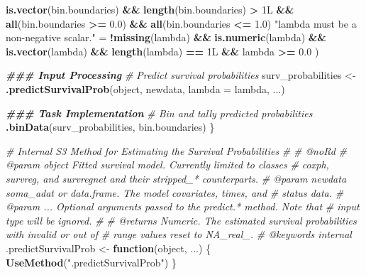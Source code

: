 \documentclass[
]{book}
\newenvironment{Shaded}{\begin{snugshade}}{\end{snugshade}}
\newcommand{\AttributeTok}[1]{\textcolor[rgb]{0.13,0.29,0.53}{#1}}
\newcommand{\CommentTok}[1]{\textcolor[rgb]{0.56,0.35,0.01}{\textit{#1}}}
\newcommand{\ControlFlowTok}[1]{\textcolor[rgb]{0.13,0.29,0.53}{\textbf{#1}}}
\newcommand{\DocumentationTok}[1]{\textcolor[rgb]{0.56,0.35,0.01}{\textbf{\textit{#1}}}}
\newcommand{\FloatTok}[1]{\textcolor[rgb]{0.00,0.00,0.81}{#1}}
\newcommand{\FunctionTok}[1]{\textcolor[rgb]{0.13,0.29,0.53}{\textbf{#1}}}
\newcommand{\NormalTok}[1]{#1}
\newcommand{\OtherTok}[1]{\textcolor[rgb]{0.56,0.35,0.01}{#1}}
\newcommand{\SpecialCharTok}[1]{\textcolor[rgb]{0.81,0.36,0.00}{\textbf{#1}}}
\newcommand{\StringTok}[1]{\textcolor[rgb]{0.31,0.60,0.02}{#1}}
\begin{document}
\begin{Shaded}
\begin{Highlighting}[]
        \FunctionTok{is.vector}\NormalTok{(bin.boundaries) }\SpecialCharTok{\&\&} \FunctionTok{length}\NormalTok{(bin.boundaries) }\SpecialCharTok{\textgreater{}}\NormalTok{ 1L }\SpecialCharTok{\&\&} 
        \FunctionTok{all}\NormalTok{(bin.boundaries }\SpecialCharTok{\textgreater{}=} \FloatTok{0.0}\NormalTok{) }\SpecialCharTok{\&\&} \FunctionTok{all}\NormalTok{(bin.boundaries }\SpecialCharTok{\textless{}=} \FloatTok{1.0}\NormalTok{)}
    \StringTok{"\textasciigrave{}lambda\textasciigrave{} must be a non{-}negative scalar."} \OtherTok{=} 
      \SpecialCharTok{!}\FunctionTok{missing}\NormalTok{(lambda) }\SpecialCharTok{\&\&} \FunctionTok{is.numeric}\NormalTok{(lambda) }\SpecialCharTok{\&\&} \FunctionTok{is.vector}\NormalTok{(lambda) }\SpecialCharTok{\&\&} 
      \FunctionTok{length}\NormalTok{(lambda) }\SpecialCharTok{==}\NormalTok{ 1L }\SpecialCharTok{\&\&}\NormalTok{ lambda }\SpecialCharTok{\textgreater{}=} \FloatTok{0.0}
\NormalTok{  )}
  
  \DocumentationTok{\#\#\# Input Processing}
  \CommentTok{\# Predict survival probabilities}
\NormalTok{  surv\_probabilities }\OtherTok{\textless{}{-}} \FunctionTok{.predictSurvivalProb}\NormalTok{(object, newdata, }\AttributeTok{lambda =}\NormalTok{ lambda, ...)}
  
  \DocumentationTok{\#\#\# Task Implementation}
  \CommentTok{\# Bin and tally predicted probabilities}
  \FunctionTok{.binData}\NormalTok{(surv\_probabilities, bin.boundaries)}
\NormalTok{\}}

\CommentTok{\#\textquotesingle{} Internal S3 Method for Estimating the Survival Probabilities}
\CommentTok{\#\textquotesingle{} }
\CommentTok{\#\textquotesingle{} @noRd}
\CommentTok{\#\textquotesingle{} @param object Fitted survival model. Currently limited to classes}
\CommentTok{\#\textquotesingle{}   \textasciigrave{}coxph\textasciigrave{}, \textasciigrave{}survreg\textasciigrave{}, and \textasciigrave{}survregnet\textasciigrave{} and their \textasciigrave{}stripped\_*\textasciigrave{} counterparts.}
\CommentTok{\#\textquotesingle{} @param newdata soma\_adat or data.frame. The model covariates, times, and}
\CommentTok{\#\textquotesingle{}   status data.}
\CommentTok{\#\textquotesingle{} @param ... Optional arguments passed to the \textasciigrave{}predict.*\textasciigrave{} method. Note that}
\CommentTok{\#\textquotesingle{}   input \textasciigrave{}type\textasciigrave{} will be ignored.}
\CommentTok{\#\textquotesingle{}}
\CommentTok{\#\textquotesingle{} @returns Numeric. The estimated survival probabilities with invalid or out of}
\CommentTok{\#\textquotesingle{}   range values reset to NA\_real\_.}
\CommentTok{\#\textquotesingle{} @keywords internal}
\NormalTok{.predictSurvivalProb }\OtherTok{\textless{}{-}} \ControlFlowTok{function}\NormalTok{(object, ...) \{ }
  \FunctionTok{UseMethod}\NormalTok{(}\StringTok{".predictSurvivalProb"}\NormalTok{) }
\NormalTok{\}}


\end{Highlighting}
\end{Shaded}
\end{document}
